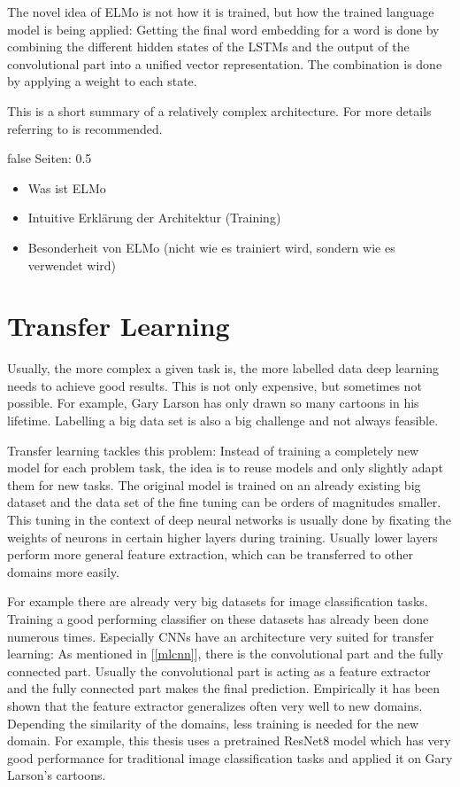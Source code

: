 \documentclass[draft,final,oneside]{vutinfth} %
\begin{document}
The novel idea of ELMo is not how it is trained, but how the trained language model is being applied: Getting the final word embedding for a word is done by combining the different hidden states of the LSTMs and the output of the convolutional part into a unified vector representation. The combination is done by applying a weight to each state.

This is a short summary of a relatively complex architecture. For more details referring to \cite{elmo} is recommended.

\if false
Seiten: 0.5

\begin{itemize}
\item Was ist ELMo
\item Intuitive Erklärung der Architektur (Training)
\item Besonderheit von ELMo (nicht wie es trainiert wird, sondern wie es verwendet wird)
\end{itemize}

\fi


\section{Transfer Learning} \label{transferlearning}

Usually, the more complex a given task is, the more labelled data deep learning needs to achieve good results. This is not only expensive, but sometimes not possible. For example, Gary Larson has only drawn so many cartoons in his lifetime. Labelling a big data set is also a big challenge and not always feasible.

Transfer learning tackles this problem: Instead of training a completely new model for each problem task, the idea is to reuse models and only slightly adapt them for new tasks. The original model is trained on an already existing big dataset and the data set of the fine tuning can be orders of magnitudes smaller. This tuning in the context of deep neural networks is usually done by fixating the weights of neurons in certain higher layers during training. Usually lower layers perform more general feature extraction, which can be transferred to other domains more easily.

For example there are already very big datasets for image classification tasks. Training a good performing classifier on these datasets has already been done numerous times. Especially CNNs have an architecture very suited for transfer learning: As mentioned in [\ref{mlcnn}], there is the convolutional part and the fully connected part. Usually the convolutional part is acting as a feature extractor and the fully connected part makes the final prediction. Empirically it has been shown that the feature extractor generalizes often very well to new domains. Depending the similarity of the domains, less training is needed for the new domain. For example, this thesis uses a pretrained ResNet8 model which has very good performance for traditional image classification tasks and applied it on Gary Larson's cartoons.
\end{document}
